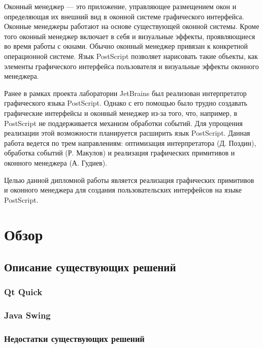 \documentclass[14pt]{extarticle}
\begin{document}
	Оконный менеджер — это приложение, управляющее размещением окон и определяющая их внешний вид в оконной системе графического интерфейса. Оконные менеджеры работают на основе существующей оконной системы. Кроме того оконный менеджер включает в себя и визуальные эффекты, проявляющиеся во время работы с окнами. Обычно оконный менеджер привязан к конкретной операционной системе. Язык PostScript позволяет нарисовать такие объекты, как элементы графического интерфейса пользователя и визуальные эффекты оконного менеджера.
	
	Ранее в рамках проекта лаборатории JetBrains был реализован интерпретатор графического языка PostScript. Однако с его помощью было трудно создавать графические интерфейсы и оконный менеджер из-за того, что, например, в PostScript не поддерживается механизм обработки событий. Для упрощения реализации этой возможности планируется расширить язык PostScript. Данная работа ведется по трем направлениям: оптимизация интерпретатора (Д. Поздин), обработка событий (Р. Макулов) и реализация графических примитивов и оконного менеджера (А. Гудиев).
	
	Целью данной дипломной работы является реализация графических примитивов и оконного менеджера для создания пользовательских интерфейсов на языке PostScript.
	
	\pagebreak
	\section{Обзор}
	\subsection{ Описание существующих решений }
		\subsubsection*{Qt Quick}

		\subsubsection*{Java Swing}
				
		\subsubsection*{Недостатки существующих решений }
	
\end{document}
